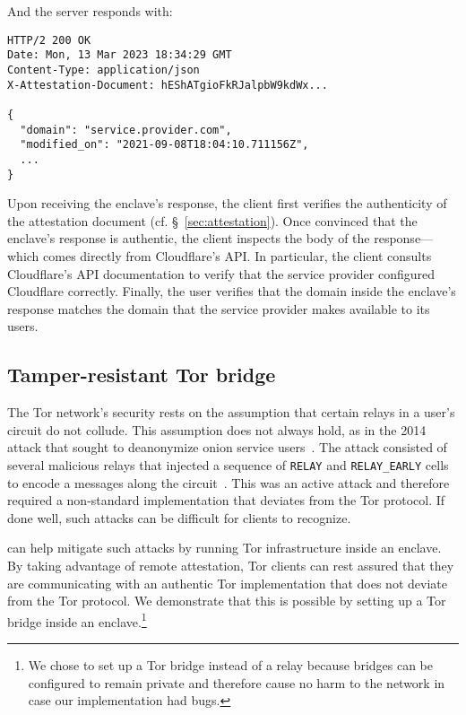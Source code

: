 And the server responds with:

\begin{lstlisting}[numbers=none,basicstyle=\small\ttfamily]
HTTP/2 200 OK
Date: Mon, 13 Mar 2023 18:34:29 GMT
Content-Type: application/json
X-Attestation-Document: hEShATgioFkRJalpbW9kdWx...

{
  "domain": "service.provider.com",
  "modified_on": "2021-09-08T18:04:10.711156Z",
  ...
}
\end{lstlisting}

Upon receiving the enclave's response, the client first verifies the
authenticity of the attestation document (cf. \S~\ref{sec:attestation}).  Once
convinced that the enclave's response is authentic, the client inspects the
body of the response---which comes directly from Cloudflare's API.  In
particular, the client consults Cloudflare's API documentation to verify that
the service provider configured Cloudflare correctly.  Finally, the user
verifies that the domain inside the enclave's response matches the domain that
the service provider makes available to its users.

\subsection{Tamper-resistant Tor bridge}
\label{sec:tor-bridge}

The Tor network's security rests on the assumption that certain relays in a
user's circuit do not collude.  This assumption does not always hold, as in the
2014 attack that sought to deanonymize onion service
users~\cite{Dingledine2015a}.  The attack consisted of several malicious relays
that injected a sequence of \texttt{RELAY} and \texttt{RELAY\_EARLY} cells to
encode a messages along the circuit~\cite[\S~5.6]{tor-spec}.  This was an active
attack and therefore required a non-standard implementation that deviates from
the Tor protocol.  If done well, such attacks can be difficult for clients to
recognize.

\Tool{} can help mitigate such attacks by running Tor infrastructure inside an
enclave.  By taking advantage of remote attestation, Tor clients can rest
assured that they are communicating with an authentic Tor implementation that
does not deviate from the Tor protocol.  We demonstrate that this is possible
by setting up a Tor bridge inside an enclave.\footnote{We chose to set up a Tor
bridge instead of a relay because bridges can be configured to remain private
and therefore cause no harm to the network in case our implementation had
bugs.}

